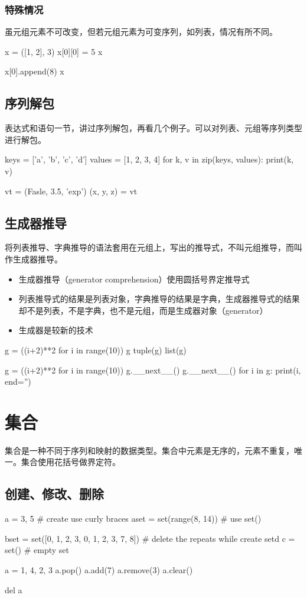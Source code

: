 \subsubsection{特殊情况}
虽元组元素不可改变，但若元组元素为可变序列，如列表，情况有所不同。
\begin{python}
x = ([1, 2], 3)
x[0][0] = 5
x

x[0].append(8)
x
\end{python}
\subsection{序列解包}
表达式和语句一节，讲过序列解包，再看几个例子。可以对列表、元组等序列类型进行解包。
\begin{python}
keys = ['a', 'b', 'c', 'd']
values = [1, 2, 3, 4]
for k, v in zip(keys, values):
    print(k, v)

vt = (Fasle, 3.5, 'exp')
(x, y, z) = vt
\end{python}
\subsection{生成器推导}
将列表推导、字典推导的语法套用在元组上，写出的推导式，不叫元组推导，而叫作生成器推导。
\begin{itemize}
\item 生成器推导（generator comprehension）使用圆括号界定推导式
\item 列表推导式的结果是列表对象，字典推导的结果是字典，生成器推导式的结果却不是列表，不是字典，也不是元组，而是生成器对象（generator）
\item 生成器是较新的技术
\end{itemize}
\begin{python}
g = ((i+2)**2 for i in range(10))
g
tuple(g)
list(g)

g = ((i+2)**2 for i in range(10))
g.__next__()
g.__next__()
for i in g:
    print(i, end='')
\end{python}

\section{集合}
集合是一种不同于序列和映射的数据类型。集合中元素是无序的，元素不重复，唯一。集合使用花括号{}做界定符。
\subsection{创建、修改、删除}
\begin{python}
  a = {3, 5}  # create use curly braces
  aset = set(range(8, 14))  # use set()

  bset = set([0, 1, 2, 3, 0, 1, 2, 3, 7, 8]) # delete the repeats while create setd 
  c = set()  #  empty set
  
  a = {1, 4, 2, 3}
  a.pop()  
  a.add(7) 
  a.remove(3)  
  a.clear() 
  
  del a 
\end{python}
